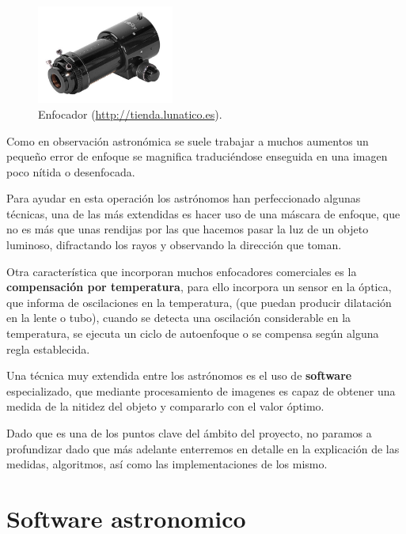 \begin{figure}[h]
	\begin{center}
		\includegraphics[width=0.4\textwidth]{../images/enfocador.jpg}
		\caption[Enfocador]{Enfocador (\href{http://tienda.lunatico.es}{http://tienda.lunatico.es}).}
		\label{fig:diag_scrum}
	\end{center}
\end{figure}


\bigskip
Como en observación astronómica se suele trabajar a muchos aumentos un pequeño error de enfoque se magnifica traduciéndose enseguida en una imagen poco nítida o desenfocada.

\bigskip
Para ayudar en esta operación los astrónomos han perfeccionado algunas técnicas, una de las más extendidas es hacer uso de una máscara de enfoque, \cite{FocusMascara} que no es más que unas rendijas por las que hacemos pasar la luz de un objeto luminoso, difractando los rayos y observando la dirección que toman.

\bigskip
Otra característica que incorporan muchos enfocadores comerciales es la \textbf{compensación por temperatura}, para ello incorpora un sensor en la óptica, que informa de  oscilaciones en la temperatura, (que puedan producir dilatación en la lente o tubo), 
cuando se detecta una oscilación considerable en la temperatura, se ejecuta un ciclo de autoenfoque o se compensa según alguna regla establecida.


Una técnica muy extendida entre los astrónomos es el uso de \textbf{software} especializado, que mediante procesamiento de imagenes es capaz de obtener una medida de la nitidez del objeto y compararlo con el valor óptimo.

\bigskip
Dado que es una de los puntos clave del ámbito del proyecto, no paramos a profundizar dado que más adelante enterremos en detalle en la explicación de las medidas, algoritmos, así como las implementaciones de los mismo.


\section{Software astronomico}


